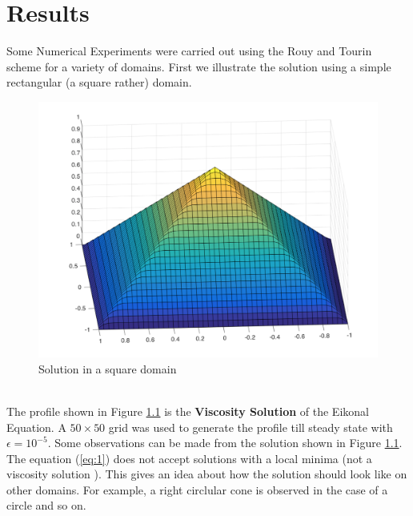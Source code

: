 \documentclass[11pt]{report}
\begin{document}
\chapter{Results}
Some Numerical Experiments were carried out using the Rouy and Tourin scheme for a variety of domains. First we illustrate the solution using a simple rectangular (a square rather) domain.
\begin{figure}[h!]
	\centering
	\includegraphics[scale = 0.4]{square.png}
	\caption{Solution in a square domain}
	\label{fig:3}
\end{figure}\\
\noindent
The profile shown in Figure \ref{fig:3} is the \textbf{Viscosity Solution} of the Eikonal Equation. A $50 \times 50$ grid was used to generate the profile till steady state with $\epsilon = 10^{-5}$. Some observations can be made from the solution shown in Figure \ref{fig:3}. The equation (\ref{eq:1}) does not accept solutions with a local minima (not a viscosity solution \cite{lions}). This gives an idea about how the solution should look like on other domains. For example, a right circlular cone is observed in the case of a circle and so on. \\
\end{document}
